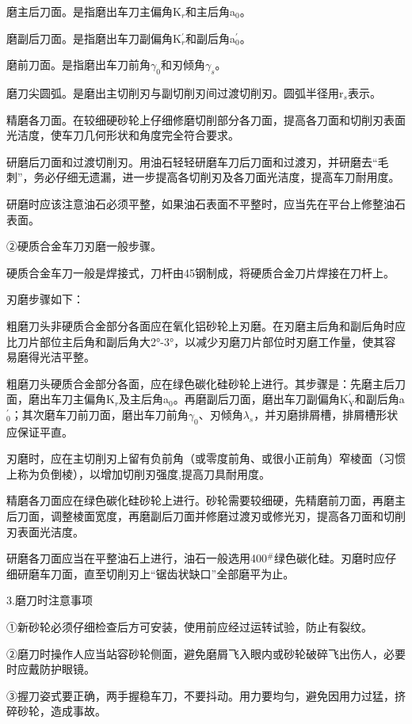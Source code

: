 \documentclass{ctexbook}
\begin{document}
磨主后刀面。是指磨出车刀主偏角K$_r$和主后角a$_0$。

磨副后刀面。是指磨出车刀副偏角K$^{\prime}_{r}$和副后角a$^{\prime}_{0}$。

磨前刀面。是指磨出车刀前角$\gamma_{0}$和刃倾角$\gamma_{s}$。

磨刀尖圆弧。是磨出主切削刃与副切削刃间过渡切削刃。圆弧半径用r$_{s}$表示。

精磨各刀面。在较细硬砂轮上仔细修磨切削部分各刀面，提高各刀面和切削刃表面光洁度，使车刀几何形状和角度完全符合要求。

研磨后刀面和过渡切削刃。用油石轻轻研磨车刀后刀面和过渡刃，并研磨去“毛刺”，务必仔细无遗漏，进一步提高各切削刃及各刀面光洁度，提高车刀耐用度。

研磨时应该注意油石必须平整，如果油石表面不平整时，应当先在平台上修整油石表面。

②硬质合金车刀刃磨一般步骤。

硬质合金车刀一般是焊接式，刀杆由45钢制成，将硬质合金刀片焊接在刀杆上。

刃磨步骤如下：

粗磨刀头非硬质合金部分各面应在氧化铝砂轮上刃磨。在刃磨主后角和副后角时应比刀片部位主后角和副后角大2°-3°，以减少刃磨刀片部位时刃磨工作量，使其容易磨得光洁平整。

粗磨刀头硬质合金部分各面，应在绿色碳化硅砂轮上进行。其步骤是：先磨主后刀面，磨出车刀主偏角K$_{r}$及主后角a$_{0}$。再磨副后刀面，磨出车刀副偏角K$^{\prime}_{\text{Y}}$和副后角a$^{\prime}_{0}$；其次磨车刀前刀面，磨出车刀前角$\gamma_{0}$、刃倾角$\lambda_{s}$，并刃磨排屑槽，排屑槽形状应保证平直。

刃磨时，应在主切削刃上留有负前角（或零度前角、或很小正前角）窄棱面（习惯上称为负倒棱），以增加切削刃强度,提高刀具耐用度。

精磨各刀面应在绿色碳化硅砂轮上进行。砂轮需要较细硬，先精磨前刀面，再磨主后刀面，调整棱面宽度，再磨副后刀面并修磨过渡刃或修光刃，提高各刀面和切削刃表面光洁度。

研磨各刀面应当在平整油石上进行，油石一般选用400$^{\#}$绿色碳化硅。刃磨时应仔细研磨车刀面，直至切削刃上“锯齿状缺口”全部磨平为止。

3.磨刀时注意事项

①新砂轮必须仔细检查后方可安装，使用前应经过运转试验，防止有裂纹。

②磨刀时操作人应当站容砂轮侧面，避免磨屑飞入眼内或砂轮破碎飞出伤人，必要时应戴防护眼镜。

③握刀姿式要正确，两手握稳车刀，不要抖动。用力要均匀，避免因用力过猛，挤碎砂轮，造成事故。
\end{document}
